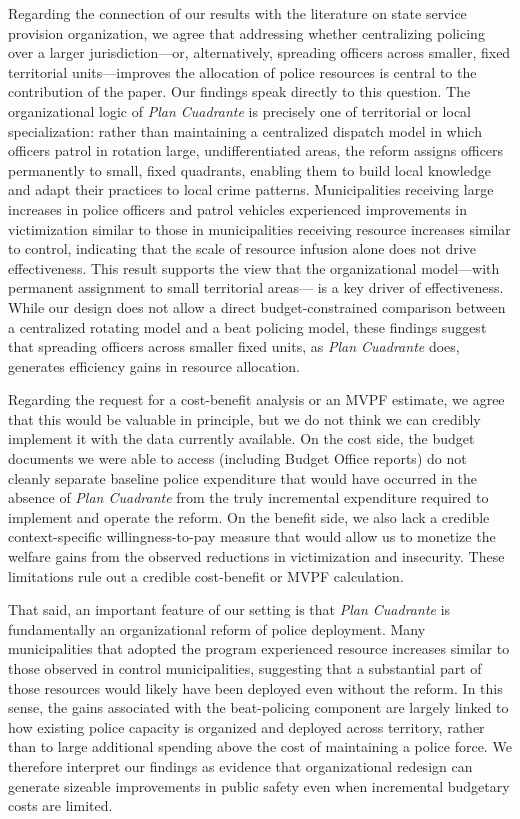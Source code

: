 Regarding the connection of our results with the literature on state service provision organization, we agree that addressing whether centralizing policing over a larger jurisdiction—or, alternatively, spreading officers across smaller, fixed territorial units—improves the allocation of police resources is central to the contribution of the paper. Our findings speak directly to this question. The organizational logic of \emph{Plan Cuadrante} is precisely one of territorial or local specialization: rather than maintaining a centralized dispatch model in which officers patrol in rotation large, undifferentiated areas, the reform assigns officers permanently to small, fixed quadrants, enabling them to build local knowledge and adapt their practices to local crime patterns. Municipalities receiving large increases in police officers and patrol vehicles experienced improvements in victimization similar to those in municipalities receiving resource increases similar to control, indicating that the scale of resource infusion alone does not drive effectiveness. This result supports the view that the organizational model---with permanent assignment to small territorial  areas--- is a key driver of effectiveness. While our design does not allow a direct budget-constrained comparison between a centralized rotating model and a beat policing model, these findings suggest that spreading officers across smaller fixed units, as \emph{Plan Cuadrante} does, generates efficiency gains in resource allocation.

Regarding the request for a cost-benefit analysis or an MVPF estimate, we agree that this would be valuable in principle, but we do not think we can credibly implement it with the data currently available. On the cost side, the budget documents we were able to access (including Budget Office reports) do not cleanly separate baseline police expenditure that would have occurred in the absence of \emph{Plan Cuadrante} from the truly incremental expenditure required to implement and operate the reform. On the benefit side, we also lack a credible context-specific willingness-to-pay measure that would allow us to monetize the welfare gains from the observed reductions in victimization and insecurity. These limitations rule out a credible cost-benefit or MVPF calculation.

That said, an important feature of our setting is that \emph{Plan Cuadrante} is fundamentally an organizational reform of police deployment. Many municipalities that adopted the program experienced resource increases similar to those observed in control municipalities, suggesting that a substantial part of those resources would likely have been deployed even without the reform. In this sense, the gains associated with the beat-policing component are largely linked to how existing police capacity is organized and deployed across territory, rather than to large additional spending above the cost of maintaining a police force. We therefore interpret our findings as evidence that organizational redesign can generate sizeable improvements in public safety even when incremental budgetary costs are limited.



